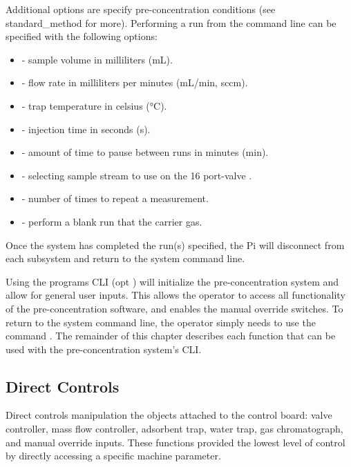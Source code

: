 Additional options are  specify pre-concentration conditions (see standard\_method for more). Performing a run from the command line can be specified with the following options: %
\begin{itemize}
    \item {} - sample volume in milliliters (mL).
    \item {} - flow rate in milliliters per minutes (mL/min, sccm).
    \item {} - trap temperature in celsius (°C).
    \item {} - injection time in seconds (s).
    \item {} - amount of time to pause between runs in minutes (min).
    \item {} - selecting sample stream to use on the 16 port-valve .
    \item {} - number of times to repeat a measurement.
    \item {} - perform a blank run that  the carrier gas.
\end{itemize}
Once the system has completed the run(s) specified, the Pi will disconnect from each subsystem and return to the system command line.

Using the programs CLI (opt ) will initialize the pre-concentration system and allow for general user inputs. This allows the operator to access all functionality of the pre-concentration software, and enables the manual override switches. To return to the system command line, the operator simply needs to use the command . The remainder of this chapter describes each function that can be used with the pre-concentration system's CLI.

\subsection{Direct Controls}
Direct controls manipulation the objects attached to the control board: valve controller, mass flow controller, adsorbent trap, water trap, gas chromatograph, and manual override inputs. These functions provided the lowest level of control by directly accessing a specific machine parameter.

